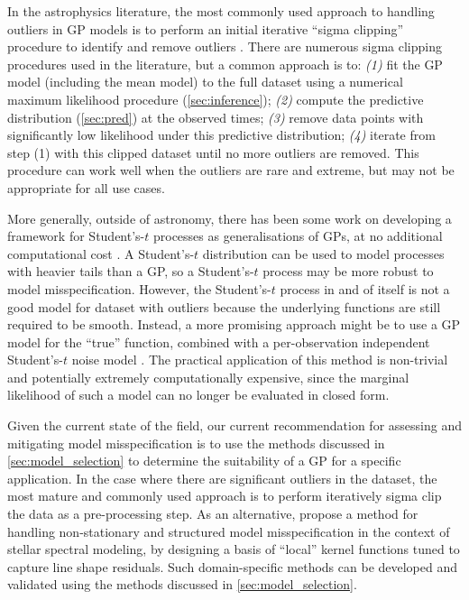 \documentclass[letterpaper]{ar-1col}
\begin{document}
In the astrophysics literature, the most commonly used approach to handling outliers in GP models is to perform an initial iterative ``sigma clipping'' procedure to identify and remove outliers \citep[e.g.,][]{2019ApJ...885L..12D}.
There are numerous sigma clipping procedures used in the literature, but a common approach is to: \emph{(1)} fit the GP model (including the mean model) to the full dataset using a numerical maximum likelihood procedure (\autoref{sec:inference}); \emph{(2)} compute the predictive distribution (\autoref{sec:pred}) at the observed times; \emph{(3)} remove data points with significantly low likelihood under this predictive distribution; \emph{(4)} iterate from step (1) with this clipped dataset until no more outliers are removed.
This procedure can work well when the outliers are rare and extreme, but may not be appropriate for all use cases.

More generally, outside of astronomy, there has been some work on developing a framework for Student's-$t$ processes as generalisations of GPs, at no additional computational cost \citep[e.g.,][]{shah2014student, Tracey_2018}.
A Student's-$t$ distribution can be used to model processes with heavier tails than a GP, so a Student's-$t$ process may be more robust to model misspecification.
However, the Student's-$t$ process in and of itself is not a good model for dataset with outliers because the underlying functions are still required to be smooth.
Instead, a more promising approach might be to use a GP model for the ``true'' function, combined with a per-observation independent Student's-$t$ noise model \citep[e.g.,][]{NIPS2009_13fe9d84}.
The practical application of this method is non-trivial and potentially extremely computationally expensive, since the marginal likelihood of such a model can no longer be evaluated in closed form.

Given the current state of the field, our current recommendation for assessing and mitigating model misspecification is to use the methods discussed in \autoref{sec:model_selection} to determine the suitability of a GP for a specific application.
In the case where there are significant outliers in the dataset, the most mature and commonly used approach is to perform iteratively sigma clip the data as a pre-processing step.
As an alternative, \citet{2015ApJ...812..128C} propose a method for handling non-stationary and structured model misspecification in the context of stellar spectral modeling, by designing a basis of ``local'' kernel functions tuned to capture line shape residuals.
Such domain-specific methods can be developed and validated using the methods discussed in \autoref{sec:model_selection}.
\end{document}
